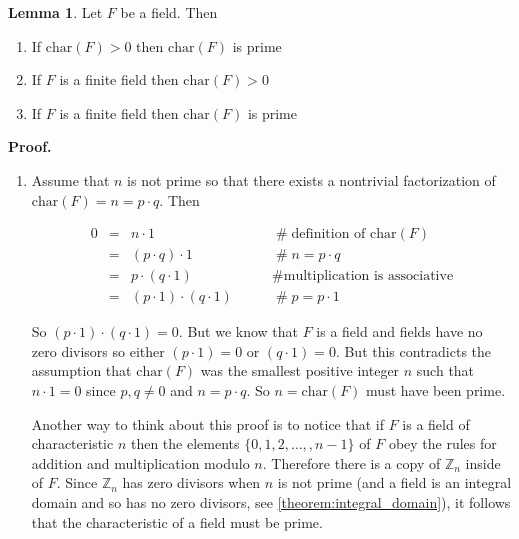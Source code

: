 \documentclass{article}
\theoremstyle{definition}
\newtheorem{lemma}{Lemma}[section]
\begin{document}
\begin{lemma}
Let $F$ be a field. Then
\begin{enumerate}
\item If $\text{char}(F) > 0$  then $\text{char} (F)$ is prime
\label{char:1}
\item If $F$ is a finite field then $\text{char} (F)  >  0$
\label{char:2}
\item If $F$ is a finite field then $\text{char} (F)$ is prime
\end{enumerate}
\end{lemma}

\bigskip
\noindent
\textbf{Proof.} 

\begin{enumerate}
\item Assume that $n$ is not prime so that there exists a
nontrivial factorization of $\text{char}(F) = n = p \cdot
q$. Then 

\begin{equation*}
\begin{array}{rcll}
0
&=& n \cdot 1                           
			&\qquad \mathrel{\#} \text{definition of $\text{char}(F)$} \\
[5pt]
&=& (p \cdot q) \cdot 1                 
			&\qquad \mathrel{\#} n = p \cdot q \\
[5pt]
&=& p \cdot (q \cdot 1)                 
			&\qquad \mathrel{\#} \text{multiplication is associative} \\
[5pt]
&=& (p \cdot 1) \cdot (q \cdot 1)       &\qquad \mathrel{\#} p = p \cdot 1
\end{array}
\end{equation*}

So $(p \cdot 1) \cdot (q \cdot 1) = 0$. But we know that $F$ is a
field and fields have no zero divisors so either $(p \cdot 1) =
0$ or $(q \cdot 1) = 0$. But this contradicts the assumption that
$\text{char}(F)$ was the smallest positive integer $n$ such that
$n \cdot 1 = 0$ since $p, q \neq 0$ and $n = p \cdot q$. So $n =
\text{char}(F)$ must have been prime.
\label{enumerate:1}

Another way to think about this proof is to notice that if $F$ is
a field of characteristic $n$ then the elements
$\{0,1,2,\hdots,,n-1\}$ of $F$ obey the rules for addition and
multiplication modulo $n$. Therefore there is a copy of
$\mathbb{Z}_n$ inside of $F$. Since $\mathbb{Z}_n$ has zero
divisors when $n$ is not prime (and a field is an integral domain
and so has no zero divisors, see 
\ref{theorem:integral_domain}), it follows that the characteristic of
a field must be prime.


\end{enumerate}
\end{document}
